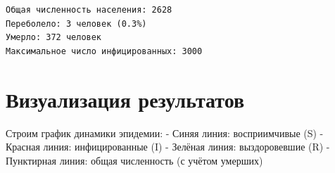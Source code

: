 \documentclass[
  12pt,
  a4paper,
  DIV=11,
  numbers=noendperiod]{scrreprt}
\newenvironment{Shaded}{\begin{snugshade}}{\end{snugshade}}
\newcommand{\FloatTok}[1]{\textcolor[rgb]{0.68,0.00,0.00}{#1}}
\newcommand{\FunctionTok}[1]{\textcolor[rgb]{0.28,0.35,0.67}{#1}}
\newcommand{\KeywordTok}[1]{\textcolor[rgb]{0.00,0.23,0.31}{#1}}
\newcommand{\NormalTok}[1]{\textcolor[rgb]{0.00,0.23,0.31}{#1}}
\newcommand{\OperatorTok}[1]{\textcolor[rgb]{0.37,0.37,0.37}{#1}}
\newcommand{\SpecialCharTok}[1]{\textcolor[rgb]{0.37,0.37,0.37}{#1}}
\newcommand{\StringTok}[1]{\textcolor[rgb]{0.13,0.47,0.30}{#1}}
\begin{document}
\begin{Shaded}
\end{Shaded}

\begin{verbatim}
Общая численность населения: 2628
Переболело: 3 человек (0.3%)
Умерло: 372 человек
Максимальное число инфицированных: 3000
\end{verbatim}

\section{Визуализация
результатов}\label{ux432ux438ux437ux443ux430ux43bux438ux437ux430ux446ux438ux44f-ux440ux435ux437ux443ux43bux44cux442ux430ux442ux43eux432}

Строим график динамики эпидемии: - Синяя линия: восприимчивые (S) -
Красная линия: инфицированные (I) - Зелёная линия: выздоровевшие (R) -
Пунктирная линия: общая численность (с учётом умерших)
\end{document}
